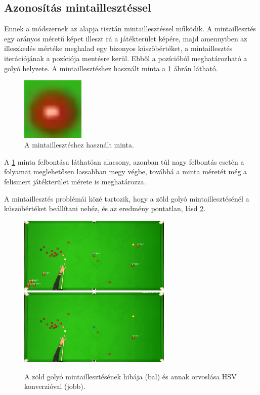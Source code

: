 \subsection{Azonosítás mintaillesztéssel}
Ennek a módszernek az alapja tisztán mintaillesztéssel működik. A mintaillesztés egy arányos méretű képet illeszt rá a játékterület képére, majd amennyiben az illeszkedés mértéke meghalad egy bizonyos küszöbértéket, a mintaillesztés iterációjának a pozíciója mentésre kerül. Ebből a pozícióból meghatározható a golyó helyzete. A mintaillesztéshez használt minta a \ref{fig:minta_kep} ábrán látható.

\begin{figure}[!ht]
    \centering
    \includegraphics[width=30mm, keepaspectratio]{figures/template_red.png}
    \caption{A mintaillesztéshez használt minta.}
    \label{fig:minta_kep}
\end{figure}

\par A \ref{fig:minta_kep} minta felbontása láthatóan alacsony, azonban túl nagy felbontás esetén a folyamat meglehetősen lassabban megy végbe, továbbá a minta méretét még a felismert játékterület mérete is meghatározza.
\par A mintaillesztés problémái közé tartozik, hogy a zöld golyó mintaillesztésénél a küszöbértéket beállítani nehéz, és az eredmény pontatlan, lásd \ref{fig:rossz_zold}.

\begin{figure}[!ht]
    \centering
    \includegraphics[width=73mm, keepaspectratio]{figures/wrong_green.png}\hspace{2mm}
	\includegraphics[width=73mm, keepaspectratio]{figures/green_ok.png}\\\vspace{5mm}
    \caption{A zöld golyó mintaillesztésének hibája (bal) és annak orvoslása HSV konverzióval (jobb).}
    \label{fig:rossz_zold}
\end{figure}

